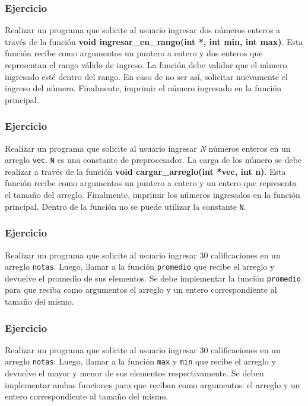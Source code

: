 \subsubsection{Ejercicio}
Realizar un programa que solicite al usuario ingresar dos números enteros a través de la función \textbf{void ingresar\_en\_rango(int *, int min, int max)}. Esta función recibe como argumentos un puntero a entero y dos enteros que representan el rango válido de ingreso. La función debe validar que el número ingresado esté dentro del rango. En caso de no ser así, solicitar nuevamente el ingreso del número. Finalmente, imprimir el número ingresado en la función principal.

\subsubsection{Ejercicio}
Realizar un programa que solicite al usuario ingresar \textit{N} números enteros en un arreglo \texttt{vec}. \texttt{N} es una constante de preprocesador. La carga de los número se debe realizar a través de la función \textbf{void cargar\_arreglo(int *vec, int n)}. Esta función recibe como argumentos un puntero a entero y un entero que representa el tamaño del arreglo. Finalmente, imprimir los números ingresados en la función principal. Dentro de la función no se puede utilizar la constante \texttt{N}.

\subsubsection{Ejercicio}
Realizar un programa que solicite al usuario ingresar 30 calificaciones en un arreglo \texttt{notas}. Luego, llamar a la función \texttt{promedio} que recibe el arreglo y devuelve el promedio de sus elementos. Se debe implementar la función \texttt{promedio} para que reciba como argumentos el arreglo y un entero correspondiente al tamaño del mismo.

\subsubsection{Ejercicio}
Realizar un programa que solicite al usuario ingresar 30 calificaciones en un arreglo \texttt{notas}. Luego, llamar a la función \texttt{max} y \texttt{min} que recibe el arreglo y devuelve el mayor y menor de sus elementos respectivamente. Se deben implementar ambas funciones para que reciban como argumentos: el arreglo y un entero correspondiente al tamaño del mismo.


